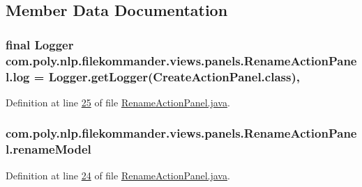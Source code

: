 \subsection{Member Data Documentation}
\hypertarget{classcom_1_1poly_1_1nlp_1_1filekommander_1_1views_1_1panels_1_1_rename_action_panel_a4e84c4017b3461afab7a58319fca6dcc}{
\subsubsection[{log}]{\setlength{\rightskip}{0pt plus 5cm}final Logger com.\-poly.\-nlp.\-filekommander.\-views.\-panels.\-Rename\-Action\-Panel.\-log = Logger.\-get\-Logger(Create\-Action\-Panel.\-class)\hspace{0.3cm}{\ttfamily [static]}, {\ttfamily [private]}}}\label{classcom_1_1poly_1_1nlp_1_1filekommander_1_1views_1_1panels_1_1_rename_action_panel_a4e84c4017b3461afab7a58319fca6dcc}


Definition at line \hyperlink{L25}{25} of file \hyperlink{}{Rename\-Action\-Panel.\-java}.

\hypertarget{classcom_1_1poly_1_1nlp_1_1filekommander_1_1views_1_1panels_1_1_rename_action_panel_a6225fd2a8c41ace06f7cbf690ff1fa66}{
\subsubsection[{rename\-Model}]{ com.\-poly.\-nlp.\-filekommander.\-views.\-panels.\-Rename\-Action\-Panel.\-rename\-Model\hspace{0.3cm}{\ttfamily [private]}}}\label{classcom_1_1poly_1_1nlp_1_1filekommander_1_1views_1_1panels_1_1_rename_action_panel_a6225fd2a8c41ace06f7cbf690ff1fa66}


Definition at line \hyperlink{L24}{24} of file \hyperlink{}{Rename\-Action\-Panel.\-java}.

